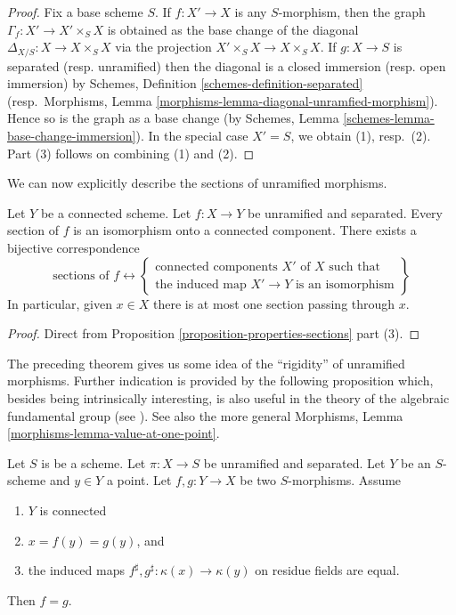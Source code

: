 \begin{proof}
Fix a base scheme $S$.
If $f : X' \to X$ is any $S$-morphism, then the graph
$\Gamma_f : X' \to X' \times_S X$
is obtained as the base change of the diagonal
$\Delta_{X/S} : X \to X \times_S X$ via the projection
$X' \times_S X \to X \times_S X$.
If $g : X \to S$ is separated (resp. unramified)
then the diagonal is a closed immersion (resp. open immersion)
by Schemes, Definition \ref{schemes-definition-separated}
(resp.\ Morphisms, Lemma \ref{morphisms-lemma-diagonal-unramfied-morphism}).
Hence so is the graph as a base change (by
Schemes, Lemma \ref{schemes-lemma-base-change-immersion}).
In the special case $X' = S$, we obtain (1), resp.\ (2).
Part (3) follows on combining (1) and (2).
\end{proof}

\noindent
We can now explicitly describe the sections of unramified morphisms.

\begin{theorem}
\label{theorem-sections-unramified-maps}
Let $Y$ be a connected scheme.
Let $f : X \to Y$ be unramified and separated.
Every section of $f$ is an isomorphism onto a connected component.
There exists a bijective correspondence
$$
\text{sections of }f
\leftrightarrow
\left\{
\begin{matrix}
\text{connected components }X'\text{ of }X\text{ such that}\\
\text{the induced map }X' \to Y\text{ is an isomorphism}
\end{matrix}
\right\}
$$
In particular, given $x \in X$ there is at most one
section passing through $x$.
\end{theorem}

\begin{proof}
Direct from Proposition \ref{proposition-properties-sections} part (3).
\end{proof}

\noindent
The preceding theorem gives us some idea of the ``rigidity'' of unramified
morphisms. Further indication is provided by the following proposition
which, besides being intrinsically interesting, is also useful in the
theory of the algebraic fundamental group (see \cite[Expos\'e V]{SGA1}).
See also the more general
Morphisms, Lemma \ref{morphisms-lemma-value-at-one-point}.

\begin{proposition}
\label{proposition-equality}
Let $S$ is be a scheme.
Let $\pi : X \to S$ be unramified and separated.
Let $Y$ be an $S$-scheme and $y \in Y$ a point.
Let $f, g : Y \to X$ be two $S$-morphisms. Assume
\begin{enumerate}
\item $Y$ is connected
\item $x = f(y) = g(y)$, and
\item the induced maps $f^\sharp, g^\sharp : \kappa(x) \to \kappa(y)$
on residue fields are equal.
\end{enumerate}
Then $f = g$.
\end{proposition}

